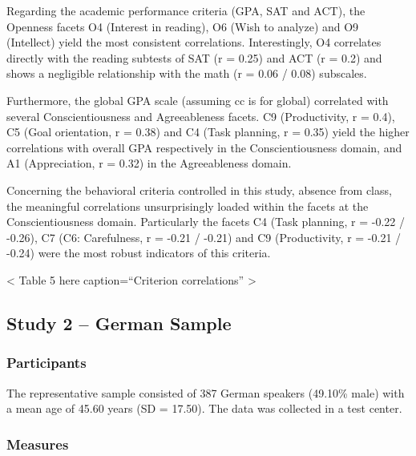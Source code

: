 \documentclass[,man]{apa6}
\theoremstyle{definition}
\theoremstyle{definition}
\theoremstyle{definition}
\theoremstyle{remark}
\begin{document}
Regarding the academic performance criteria (GPA, SAT and ACT), the
Openness facets O4 (Interest in reading), O6 (Wish to analyze) and O9
(Intellect) yield the most consistent correlations. Interestingly, O4
correlates directly with the reading subtests of SAT (r = 0.25) and ACT
(r = 0.2) and shows a negligible relationship with the math (r = 0.06 /
0.08) subscales.

Furthermore, the global GPA scale (assuming cc is for global) correlated
with several Conscientiousness and Agreeableness facets. C9
(Productivity, r = 0.4), C5 (Goal orientation, r = 0.38) and C4 (Task
planning, r = 0.35) yield the higher correlations with overall GPA
respectively in the Conscientiousness domain, and A1 (Appreciation, r =
0.32) in the Agreeableness domain.

Concerning the behavioral criteria controlled in this study, absence
from class, the meaningful correlations unsurprisingly loaded within the
facets at the Conscientiousness domain. Particularly the facets C4 (Task
planning, r = -0.22 / -0.26), C7 (C6: Carefulness, r = -0.21 / -0.21)
and C9 (Productivity, r = -0.21 / -0.24) were the most robust indicators
of this criteria.

\vspace{5mm}

\textless{} Table 5 here caption=\enquote{Criterion correlations}
\textgreater{}

\vspace{5mm}

\hypertarget{study-2-german-sample}{%
\subsection{Study 2 -- German Sample}\label{study-2-german-sample}}

\hypertarget{participants-1}{%
\subsubsection{Participants}\label{participants-1}}

The representative sample consisted of 387 German speakers (49.10\%
male) with a mean age of 45.60 years (SD = 17.50). The data was
collected in a test center.

\hypertarget{measures-1}{%
\subsubsection{Measures}\label{measures-1}}
\end{document}
